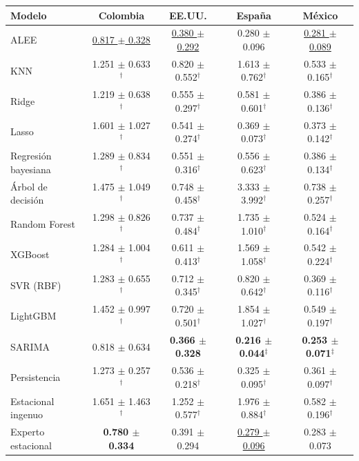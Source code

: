 \begin{tabular}{lcccc}
\toprule
Modelo & Colombia & EE.UU. & España & México \\
\midrule
ALEE & \underline{0.817 $\pm$ 0.328} & \underline{0.380 $\pm$ 0.292} & 0.280 $\pm$ 0.096 & \underline{0.281 $\pm$ 0.089} \\
\midrule
KNN & 1.251 $\pm$ 0.633$^{\dagger}$ & 0.820 $\pm$ 0.552$^{\dagger}$ & 1.613 $\pm$ 0.762$^{\dagger}$ & 0.533 $\pm$ 0.165$^{\dagger}$ \\
Ridge & 1.219 $\pm$ 0.638$^{\dagger}$ & 0.555 $\pm$ 0.297$^{\dagger}$ & 0.581 $\pm$ 0.601$^{\dagger}$ & 0.386 $\pm$ 0.136$^{\dagger}$ \\
Lasso & 1.601 $\pm$ 1.027$^{\dagger}$ & 0.541 $\pm$ 0.274$^{\dagger}$ & 0.369 $\pm$ 0.073$^{\dagger}$ & 0.373 $\pm$ 0.142$^{\dagger}$ \\
Regresión bayesiana & 1.289 $\pm$ 0.834$^{\dagger}$ & 0.551 $\pm$ 0.316$^{\dagger}$ & 0.556 $\pm$ 0.623$^{\dagger}$ & 0.386 $\pm$ 0.134$^{\dagger}$ \\
Árbol de decisión & 1.475 $\pm$ 1.049$^{\dagger}$ & 0.748 $\pm$ 0.458$^{\dagger}$ & 3.333 $\pm$ 3.992$^{\dagger}$ & 0.738 $\pm$ 0.257$^{\dagger}$ \\
Random Forest & 1.298 $\pm$ 0.826$^{\dagger}$ & 0.737 $\pm$ 0.484$^{\dagger}$ & 1.735 $\pm$ 1.010$^{\dagger}$ & 0.524 $\pm$ 0.164$^{\dagger}$ \\
XGBoost & 1.284 $\pm$ 1.004$^{\dagger}$ & 0.611 $\pm$ 0.413$^{\dagger}$ & 1.569 $\pm$ 1.058$^{\dagger}$ & 0.542 $\pm$ 0.224$^{\dagger}$ \\
SVR (RBF) & 1.283 $\pm$ 0.655$^{\dagger}$ & 0.712 $\pm$ 0.345$^{\dagger}$ & 0.820 $\pm$ 0.642$^{\dagger}$ & 0.369 $\pm$ 0.116$^{\dagger}$ \\
\midrule
LightGBM & 1.452 $\pm$ 0.997$^{\dagger}$ & 0.720 $\pm$ 0.501$^{\dagger}$ & 1.854 $\pm$ 1.027$^{\dagger}$ & 0.549 $\pm$ 0.197$^{\dagger}$ \\
SARIMA & 0.818 $\pm$ 0.634 & \textbf{0.366 $\pm$ 0.328} & \textbf{0.216 $\pm$ 0.044}$^{\ddagger}$ & \textbf{0.253 $\pm$ 0.071}$^{\ddagger}$ \\
Persistencia & 1.273 $\pm$ 0.257$^{\dagger}$ & 0.536 $\pm$ 0.218$^{\dagger}$ & 0.325 $\pm$ 0.095$^{\dagger}$ & 0.361 $\pm$ 0.097$^{\dagger}$ \\
Estacional ingenuo & 1.651 $\pm$ 1.463$^{\dagger}$ & 1.252 $\pm$ 0.577$^{\dagger}$ & 1.976 $\pm$ 0.884$^{\dagger}$ & 0.582 $\pm$ 0.196$^{\dagger}$ \\
Experto estacional & \textbf{0.780 $\pm$ 0.334} & 0.391 $\pm$ 0.294 & \underline{0.279 $\pm$ 0.096} & 0.283 $\pm$ 0.073 \\
\bottomrule
\end{tabular}